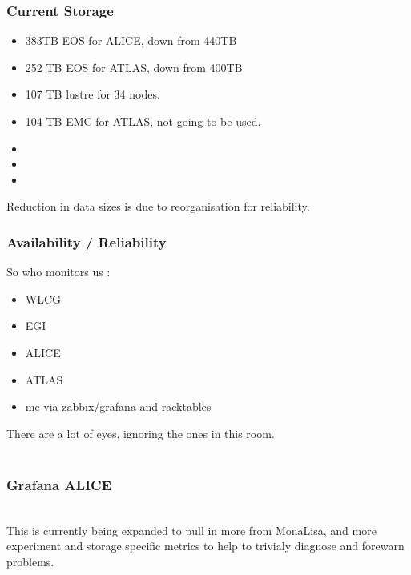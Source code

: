 \documentclass{beamer}
\begin{document}
\begin{frame}
  \frametitle{Current Storage}
  \begin{itemize}
    \item 383TB EOS for ALICE, down from 440TB
    \item 252 TB EOS for ATLAS, down from 400TB
    \item 107 TB lustre for 34 nodes.
    \item 104 TB EMC for ATLAS, not going to be used.
    \item \color{red}{400TB ALICE}
    \item \color{red}{400TB ATLAS}
    \item \color{red}{400TB General EOS}
  \end{itemize}
Reduction in data sizes is due to reorganisation for reliability.
\end{frame}



\begin{frame}
  \frametitle{Availability / Reliability}
  So who monitors us :
  \begin{itemize}
    \item WLCG
    \item EGI
    \item ALICE
    \item ATLAS
    \item me via zabbix/grafana and racktables
  \end{itemize}
There are a lot of eyes, ignoring the ones in this room.\\
\vspace{0.5cm}
\\
\vspace{0.5cm}
\end{frame}

\begin{frame}
  \frametitle{Grafana ALICE}
  \\
  This is currently being expanded to pull in more from MonaLisa, and more experiment and storage specific
  metrics to help to trivialy diagnose and forewarn problems.
\end{frame}
\end{document}
